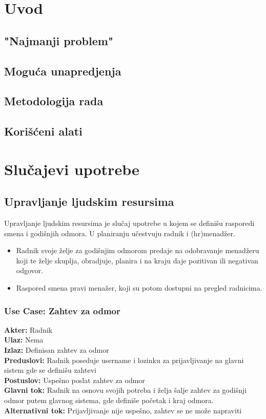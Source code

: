 \documentclass{article}
\begin{document}
\section{Uvod}
\subsection{"Najmanji problem"}
\subsection{Moguća unapredjenja}
\subsection{Metodologija rada}
\subsection{Korišćeni alati}
\section{Slučajevi upotrebe}
\subsection{Upravljanje ljudskim resursima}
Upravljanje ljudskim resursima je slučaj upotrebe u kojem se definišu rasporedi smena i godišnjih odmora. U planiranju učestvuju radnik i (hr)menadžer.

\begin{itemize}
\item Radnik svoje želje za godišnjim odmorom predaje na odobravanje menadžeru koji te želje skuplja, obradjuje, planira i na kraju daje pozitivan ili negativan odgovor.
\item Raspored smena pravi menažer, koji su potom dostupni na pregled radnicima.
\end{itemize}
\subsubsection{\textbf{Use Case}: Zahtev za odmor}
\textbf{Akter:} Radnik\\
\textbf{Ulaz:} Nema\\
\textbf{Izlaz:} Definisan zahtev za odmor\\
\textbf{Preduslovi:} Radnik poseduje username i lozinku za prijavljivanje na glavni sistem gde se definišu zahtevi\\
\textbf{Postuslov:} Uspešno poslat zahtev za odmor\\
\textbf{Glavni tok:} Radnik na osnovu svojih potreba i želja šalje zahtev za godišnji odmor putem glavnog sistema, gde definiše početak i kraj odmora.\\
\textbf{Alternativni tok:} Prijavljivanje nije uspešno, zahtev se ne može napraviti\\
\end{document}
